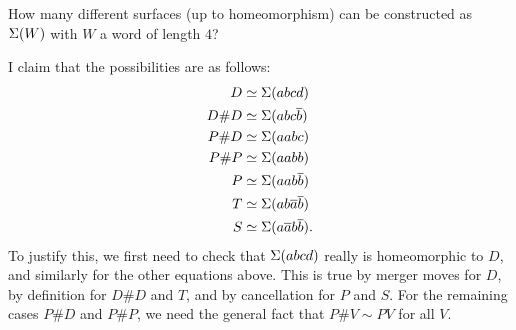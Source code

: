 \documentclass[a4paper]{amsart}
\begin{document}
\begin{exercise}
 How many different surfaces (up to homeomorphism) can be constructed
 as $\Sigma(W)$ with $W$ a word of length $4$?
\end{exercise}
\begin{solution}
 I claim that the possibilities are as follows:
 \begin{align*}
  D     &\simeq \Sigma(abcd) \\
  D\# D &\simeq \Sigma(abc\overline{b}) \\
  P\# D &\simeq \Sigma(aabc) \\
  P\# P &\simeq \Sigma(aabb) \\
  P     &\simeq \Sigma(aab\overline{b}) \\ 
  T     &\simeq \Sigma(ab\overline{a}\overline{b}) \\
  S     &\simeq \Sigma(a\overline{a} b\overline{b}).
 \end{align*}
 To justify this, we first need to check that $\Sigma(abcd)$ really is
 homeomorphic to $D$, and similarly for the other equations above.
 This is true by merger moves for $D$, by definition for $D\#D$ and
 $T$, and by cancellation for $P$ and $S$.  For the remaining cases
 $P\#D$ and $P\# P$, we need the general fact that $P\# V\sim PV$ for
 all $V$.


\end{solution}
\end{document}
